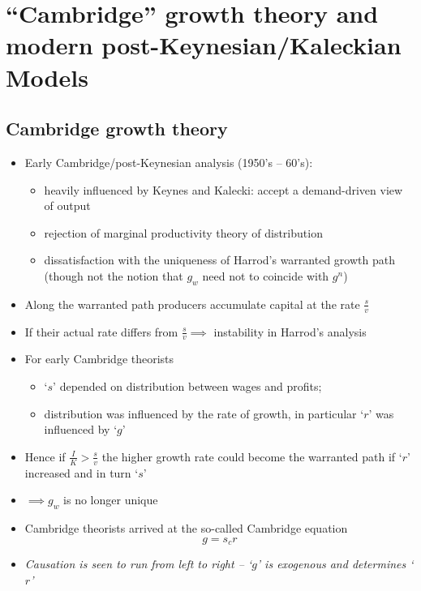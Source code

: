 \documentclass{article}
\begin{document}
\pagebreak

\section{``Cambridge'' growth theory and modern post-Keynesian/Kaleckian Models}
\subsection{Cambridge growth theory}
	\begin{itemize}
		\item Early Cambridge/post-Keynesian analysis (1950's -- 60's):
		\begin{itemize}
			\item heavily influenced by Keynes and Kalecki: accept a demand-driven view of output
			\item rejection of marginal productivity theory of distribution
			\item dissatisfaction with the uniqueness of Harrod's warranted growth path (though not the notion that \( g_w \) need not to coincide with \( g^n \))
		\end{itemize}
	   \item Along the warranted path producers accumulate capital at the rate \( \frac{s}{v} \)
	   \item If their actual rate differs from \( \frac{s}{v} \implies \) instability in Harrod's analysis
	   \item For early Cambridge theorists 
	   \begin{itemize}
		\item `\( s \)' depended on distribution between wages and profits; 
		\item distribution was influenced by the rate of growth, in particular `\( r \)' was influenced by `\( g \)'
	   \end{itemize}
	   \item Hence if \( \frac{I}{K} > \frac{s}{v} \) the higher growth rate could become the warranted path if `\( r \)' increased and in turn `\( s \)'
	   \item \( \implies g_w \) is no longer unique
	   \item  Cambridge theorists arrived at the so-called Cambridge equation
	   \begin{equation}
			g = s_c r \label{eq:7.1}
	   \end{equation}
	   \item \textit{Causation is seen to run from left to right -- `\( g \)' is exogenous and determines `\( r \)'} 
	\end{itemize}
\end{document}
